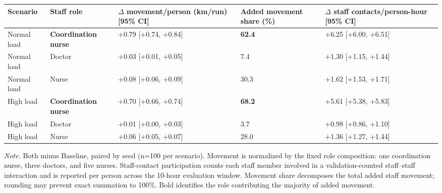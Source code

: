 \begin{tabular}{lllll}
\toprule
\textbf{Scenario} & \textbf{Staff role} & \textbf{\ensuremath{\Delta} movement/person (km/run) [95\% CI]} & \textbf{Added movement share (\%)} & \textbf{\ensuremath{\Delta} staff contacts/person-hour [95\% CI]} \\
\midrule
Normal load & \textbf{Coordination nurse} & +0.79 [+0.74, +0.84] & \textbf{62.4} & +6.25 [+6.00, +6.51] \\
Normal load & Doctor & +0.03 [+0.01, +0.05] & 7.4 & +1.30 [+1.15, +1.44] \\
Normal load & Nurse & +0.08 [+0.06, +0.09] & 30.3 & +1.62 [+1.53, +1.71] \\
\addlinespace[2pt]
High load & \textbf{Coordination nurse} & +0.70 [+0.66, +0.74] & \textbf{68.2} & +5.61 [+5.38, +5.83] \\
High load & Doctor & +0.01 [+0.00, +0.03] & 3.7 & +0.98 [+0.86, +1.10] \\
High load & Nurse & +0.06 [+0.05, +0.07] & 28.0 & +1.36 [+1.27, +1.44] \\
\bottomrule
\end{tabular}

\par\footnotesize\textit{Note.} Both minus Baseline, paired by seed (n=100 per scenario). Movement is normalized by the fixed role composition: one coordination nurse, three doctors, and five nurses. Staff-contact participation counts each staff member involved in a validation-counted staff--staff interaction and is reported per person across the 10-hour evaluation window. Movement share decomposes the total added staff movement; rounding may prevent exact summation to 100\%. Bold identifies the role contributing the majority of added movement.
